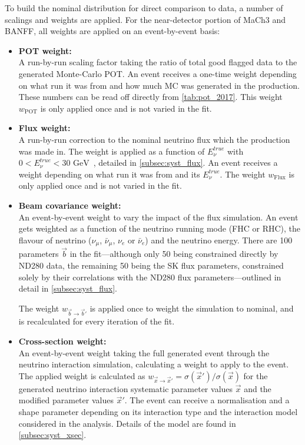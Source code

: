 To build the nominal distribution for direct comparison to data, a number of scalings and weights are applied. For the near-detector portion of MaCh3 and BANFF, all weights are applied on an event-by-event basis:
\begin{itemize}
	\item \textbf{POT weight:} \\
	A run-by-run scaling factor taking the ratio of total good flagged data to the generated Monte-Carlo POT. An event receives a one-time weight depending on what run it was from and how much MC was generated in the production. These numbers can be read off directly from \autoref{tab:pot_2017}. This weight $w_\text{POT}$ is only applied once and is not varied in the fit.
	
	\item \textbf{Flux weight:} \\
	A run-by-run correction to the nominal neutrino flux which the production was made in. The weight is applied as a function of $E_\nu^{true}$ with~$0 < E_\nu^{true} < 30 \text{ GeV}$~, detailed in \autoref{subsec:syst_flux}. An event receives a weight depending on what run it was from and its $E_\nu^{true}$. The weight $w_\text{Flux}$ is only applied once and is not varied in the fit.
	
	\item \textbf{Beam covariance weight:} \\
	An event-by-event weight to vary the impact of the flux simulation. An event gets weighted as a function of the neutrino running mode (FHC or RHC), the flavour of neutrino ($\nu_\mu$, $\bar{\nu}_\mu$, $\nu_e$ or $\bar{\nu}_e$) and the neutrino energy. There are 100 parameters $\vec{b}$ in the fit---although only 50 being constrained directly by ND280 data, the remaining 50 being the SK flux parameters, constrained solely by their correlations with the ND280 flux parameters---outlined in detail in \autoref{subsec:syst_flux}.
	
	The weight $w_{\vec{b}\rightarrow \vec{b}'}$ is applied once to weight the simulation to nominal, and is recalculated for every iteration of the fit.
	
	\item \textbf{Cross-section weight:} \\
	An event-by-event weight taking the full generated event through the neutrino interaction simulation, calculating a weight to apply to the event. The applied weight is calculated as $w_{\vec{x} \rightarrow \vec{x}'}=\sigma(\vec{x}')/\sigma(\vec{x})$ for the generated neutrino interaction systematic parameter values $\vec{x}$ and the modified parameter values $\vec{x}'$. The event can receive a normalisation and a shape parameter depending on its interaction type and the interaction model considered in the analysis. Details of the model are found in \autoref{subsec:syst_xsec}.
	

\end{itemize}
